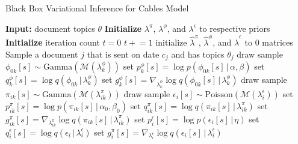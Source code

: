 \documentclass{article}
\newcommand{\pluseq}{\mathrel{+}=}
\newcommand{\g}{\, | \,}
\begin{document}
\begin{algorithm}[h]
\small
\caption{Black Box Variational Inference for Cables Model}
\label{alg:SPF}
\begin{algorithmic}[1]
\State \textbf{Input:} document topics $\theta$
\State \textbf{Initialize} $\lambda^\pi$, $\lambda^\phi$, and $\lambda^\epsilon$ to respective priors
\State \textbf{Initialize} iteration count $t = 0$
\Repeat
	\State $t \pluseq 1$
	\State initialize $\hat\lambda^{\pi}$, $\hat\lambda^{\phi}$, and $\hat\lambda^{\epsilon}$ to 0 matrices
		\State Sample a document $j$ that is sent on date $c_j$ and has topics $\theta_j$
        				\State draw sample $\phi_{0k}[s] \sim \mbox{Gamma}(\mathcal{M}(\lambda^\phi_{k}))$
        				\State set $p^\phi_k[s] = \log p(\phi_{0k}[s] \g \alpha, \beta)$  
 	       			\State set $q^\phi_k[s] = \log q(\phi_{0k} \g \lambda^\phi_k)$ 
        				\State set $g^\phi_k[s] = \nabla_{\lambda^\phi_{k}} \log q(\phi_{0k}[s] \g \lambda^\phi_{k})$  
        				\For {each event $i$ on date $a_i \in \left( c_j - d, c_j \right]$}
        					\State draw sample $\pi_{ik}[s] \sim \mbox{Gamma}(\mathcal{M}(\lambda^\pi_{ik}))$
        					\State draw sample $\epsilon_i[s] \sim \mbox{Poisson}(\mathcal{M}(\lambda^\epsilon_i))$
 	       				\State set $p^\pi_{ik}[s] = \log p(\pi_{ik}[s] \g \alpha_0, \beta_0)$  
        					\State set $q^\pi_{ik}[s] = \log q(\pi_{ik}[s] \g \lambda^\pi_{ik})$
        					\State set $g^\pi_{ik}[s] = \nabla_{\lambda^\pi_{ik}} \log q(\pi_{ik}[s] \g \lambda^\pi_{ik})$
        				\EndFor
        			\EndFor
        			\For {each event $i$ on date $a_i \in \left( c_j - d, c_j \right]$}
        				\State set $p^\epsilon_i[s] = \log p(\epsilon_{i}[s] \g \eta)$ 
        				\State set $q^\epsilon_i[s] = \log q(\epsilon_i \g \lambda^\epsilon_i)$ 
        				\State set $g^\pi_{i}[s] = \nabla_{\lambda^\epsilon_{i}} \log q(\epsilon_{i}[s] \g \lambda^\epsilon_{i})$
        			\EndFor
		

\end{algorithmic}
\end{algorithm}
\end{document}
